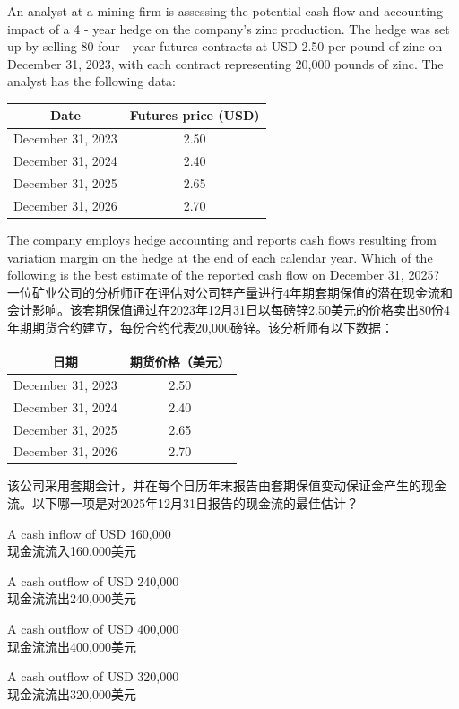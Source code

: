 \documentclass{article}
\newcounter{question} %
\begin{document}
    \begin{question}
        An analyst at a mining firm is assessing the potential cash flow and accounting impact of a 4 - year hedge on the company's zinc production. The hedge was set up by selling 80 four - year futures contracts at USD 2.50 per pound of zinc on December 31, 2023, with each contract representing 20,000 pounds of zinc. The analyst has the following data:
        \begin{center}
        \begin{tabular}{|c|c|}
        \hline
        Date & Futures price (USD) \\ \hline
        December 31, 2023 & 2.50 \\ \hline
        December 31, 2024 & 2.40 \\ \hline
        December 31, 2025 & 2.65 \\ \hline
        December 31, 2026 & 2.70 \\ \hline
        \end{tabular}
        \end{center}
        The company employs hedge accounting and reports cash flows resulting from variation margin on the hedge at the end of each calendar year. Which of the following is the best estimate of the reported cash flow on December 31, 2025?
        \\ 一位矿业公司的分析师正在评估对公司锌产量进行4年期套期保值的潜在现金流和会计影响。该套期保值通过在2023年12月31日以每磅锌2.50美元的价格卖出80份4年期期货合约建立，每份合约代表20,000磅锌。该分析师有以下数据：
        \begin{center}
        \begin{tabular}{|c|c|}
        \hline
        日期 & 期货价格（美元） \\ \hline
        December 31, 2023 & 2.50 \\ \hline
        December 31, 2024 & 2.40 \\ \hline
        December 31, 2025 & 2.65 \\ \hline
        December 31, 2026 & 2.70 \\ \hline
        \end{tabular}
        \end{center}
        该公司采用套期会计，并在每个日历年末报告由套期保值变动保证金产生的现金流。以下哪一项是对2025年12月31日报告的现金流的最佳估计？
        \end{question}
        
        \begin{choices}
            \item A cash inflow of USD 160,000\\
            现金流流入160,000美元
            \item A cash outflow of USD 240,000\\
            现金流流出240,000美元
            \item A cash outflow of USD 400,000\\
            现金流流出400,000美元
            \item A cash outflow of USD 320,000\\
            现金流流出320,000美元
        \end{choices}
        
\end{document}
